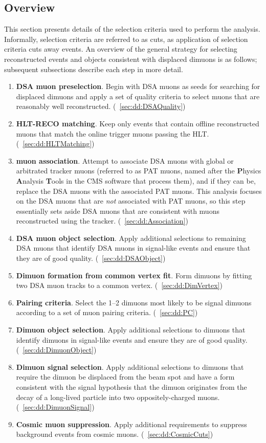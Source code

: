 \subsection{Overview}
\label{sec:dd:GeneralStrategy}
This section presents details of the selection criteria used to perform the analysis.
Informally, selection criteria are referred to as cuts, as application of selection criteria cuts away events.
An overview of the general strategy for selecting reconstructed events and objects consistent with displaced dimuons is as follows; subsequent subsections describe each step in more detail.
\clearpage
\begin{enumerate}
  \item \textbf{DSA muon preselection}. Begin with DSA muons as seeds for searching for displaced dimuons and apply a set of quality criteria to select muons that are reasonably well reconstructed. (\Sec~\ref{sec:dd:DSAQuality})
  \item \textbf{HLT-RECO matching}. Keep only events that contain offline reconstructed muons that match the online trigger muons passing the HLT. (\Sec~\ref{sec:dd:HLTMatching})
  \item \textbf{\DSAToPAT muon association}. Attempt to associate DSA muons with global or arbitrated tracker muons (referred to as PAT muons, named after the \textbf{P}hysics \textbf{A}nalysis \textbf{T}ools in the CMS software that process them), and if they can be, replace the DSA muons with the associated PAT muons. This analysis focuses on the DSA muons that are \emph{not} associated with PAT muons, so this step essentially sets aside DSA muons that are consistent with muons reconstructed using the tracker. (\Sec~\ref{sec:dd:Association})
  \item \textbf{DSA muon object selection}. Apply additional selections to remaining DSA muons that identify DSA muons in signal-like events and ensure that they are of good quality. (\Sec~\ref{sec:dd:DSAObject})
  \item \textbf{Dimuon formation from common vertex fit}. Form dimuons by fitting two DSA muon tracks to a common vertex. (\Sec~\ref{sec:dd:DimVertex})
  \item \textbf{Pairing criteria}. Select the 1--2 dimuons most likely to be signal dimuons according to a set of muon pairing criteria. (\Sec~\ref{sec:dd:PC})
  \item \textbf{Dimuon object selection}. Apply additional selections to dimuons that identify dimuons in signal-like events and ensure they are of good quality. (\Sec~\ref{sec:dd:DimuonObject})
  \item \textbf{Dimuon signal selection}. Apply additional selections to dimuons that require the dimuon be displaced from the beam spot and have a form consistent with the signal hypothesis that the dimuon originates from the decay of a long-lived particle into two oppositely-charged muons. (\Sec~\ref{sec:dd:DimuonSignal})
  \item \textbf{Cosmic muon suppression}. Apply additional requirements to suppress background events from cosmic muons. (\Sec~\ref{sec:dd:CosmicCuts})
\end{enumerate}

